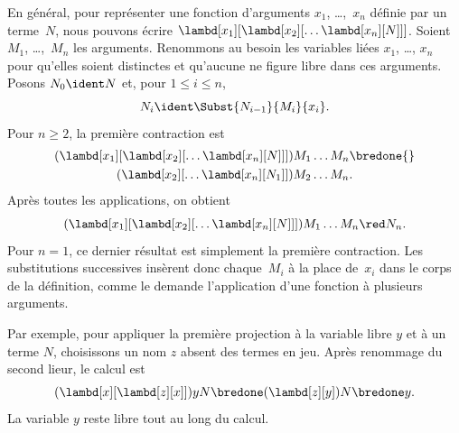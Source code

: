 \documentclass[../../../include/open-logic-section]{subfiles}
\begin{document}
En général, pour représenter une fonction
d'arguments $x_1$, \dots,~$x_n$ définie
par un terme~$N$, nous pouvons écrire
$\lambd[x_1][\lambd[x_2][\ldots
\lambd[x_n][N]]]$. Soient $M_1$,
\dots,~$M_n$ les arguments. Renommons au
besoin les variables liées $x_1$, \dots,
$x_n$ pour qu'elles soient distinctes et
qu'aucune ne figure libre dans ces arguments.
Posons $N_0\ident N$ et, pour $1\le i\le n$,
\[
N_i\ident\Subst{N_{i-1}}{M_i}{x_i}.
\]
Pour $n\ge2$, la première contraction est
\begin{multline*}
(\lambd[x_1][\lambd[x_2][\ldots
\lambd[x_n][N]]])M_1\dots M_n\bredone{}\\
(\lambd[x_2][\ldots\lambd[x_n][N_1]])
M_2\dots M_n.
\end{multline*}
Après toutes les applications, on obtient
\[
(\lambd[x_1][\lambd[x_2][\ldots
\lambd[x_n][N]]])M_1\dots M_n\red N_n.
\]
Pour $n=1$, ce dernier résultat est
simplement la première contraction. Les
substitutions successives insèrent donc
chaque~$M_i$ à la place de~$x_i$ dans
le corps de la définition, comme le demande
l'application d'une fonction à plusieurs
arguments.

Par exemple, pour appliquer la première projection
à la variable libre $y$ et à un terme $N$,
choisissons un nom $z$ absent des termes en jeu.
Après renommage du second lieur, le calcul est
\[
(\lambd[x][\lambd[z][x]])yN
\bredone (\lambd[z][y])N
\bredone y.
\]
La variable $y$ reste libre tout au long du calcul.
\end{document}
